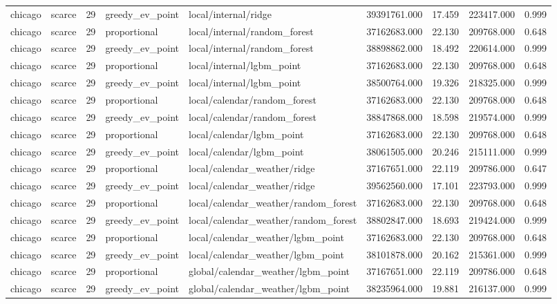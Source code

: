\begin{tabular}{llrllrrrr}
chicago & scarce & 29 & greedy\_ev\_point & local/internal/ridge & 39391761.000 & 17.459 & 223417.000 & 0.999 \\
chicago & scarce & 29 & proportional & local/internal/random\_forest & 37162683.000 & 22.130 & 209768.000 & 0.648 \\
chicago & scarce & 29 & greedy\_ev\_point & local/internal/random\_forest & 38898862.000 & 18.492 & 220614.000 & 0.999 \\
chicago & scarce & 29 & proportional & local/internal/lgbm\_point & 37162683.000 & 22.130 & 209768.000 & 0.648 \\
chicago & scarce & 29 & greedy\_ev\_point & local/internal/lgbm\_point & 38500764.000 & 19.326 & 218325.000 & 0.999 \\
chicago & scarce & 29 & proportional & local/calendar/random\_forest & 37162683.000 & 22.130 & 209768.000 & 0.648 \\
chicago & scarce & 29 & greedy\_ev\_point & local/calendar/random\_forest & 38847868.000 & 18.598 & 219574.000 & 0.999 \\
chicago & scarce & 29 & proportional & local/calendar/lgbm\_point & 37162683.000 & 22.130 & 209768.000 & 0.648 \\
chicago & scarce & 29 & greedy\_ev\_point & local/calendar/lgbm\_point & 38061505.000 & 20.246 & 215111.000 & 0.999 \\
chicago & scarce & 29 & proportional & local/calendar\_weather/ridge & 37167651.000 & 22.119 & 209786.000 & 0.647 \\
chicago & scarce & 29 & greedy\_ev\_point & local/calendar\_weather/ridge & 39562560.000 & 17.101 & 223793.000 & 0.999 \\
chicago & scarce & 29 & proportional & local/calendar\_weather/random\_forest & 37162683.000 & 22.130 & 209768.000 & 0.648 \\
chicago & scarce & 29 & greedy\_ev\_point & local/calendar\_weather/random\_forest & 38802847.000 & 18.693 & 219424.000 & 0.999 \\
chicago & scarce & 29 & proportional & local/calendar\_weather/lgbm\_point & 37162683.000 & 22.130 & 209768.000 & 0.648 \\
chicago & scarce & 29 & greedy\_ev\_point & local/calendar\_weather/lgbm\_point & 38101878.000 & 20.162 & 215361.000 & 0.999 \\
chicago & scarce & 29 & proportional & global/calendar\_weather/lgbm\_point & 37167651.000 & 22.119 & 209786.000 & 0.648 \\
chicago & scarce & 29 & greedy\_ev\_point & global/calendar\_weather/lgbm\_point & 38235964.000 & 19.881 & 216137.000 & 0.999 \\

\end{tabular}
